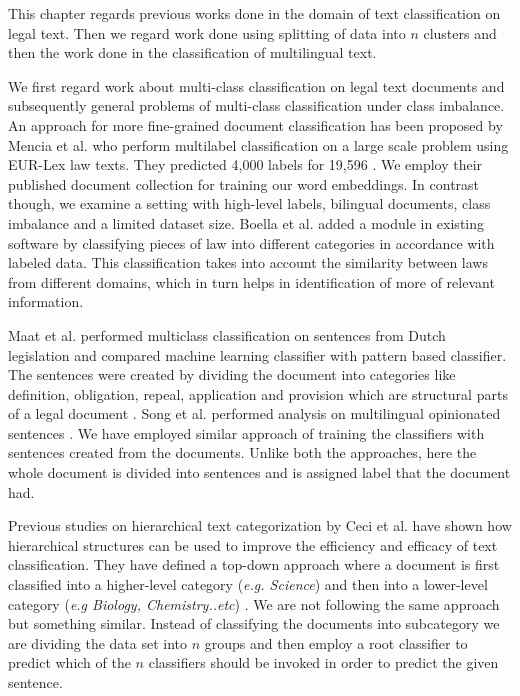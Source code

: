 \label{ch:relatedwork}

This chapter regards previous works done in the domain of text classification on legal text. Then we regard work done using  splitting of data into $n$ clusters and then the work done in the classification of multilingual text.

We first regard work about multi-class classification on legal text documents and subsequently general problems of multi-class classification under class imbalance. An approach for more fine-grained document classification has been proposed by Mencia et al. who perform multilabel classification on a large scale problem using EUR-Lex law texts. They predicted 4,000 labels for 19,596  \cite{mencia2010efficient}. We employ their published document collection for training our word embeddings. In contrast though, we examine a setting with high-level labels, bilingual documents, class imbalance and a limited dataset size. Boella et al. added a module in existing software by classifying pieces of law into different categories in accordance with labeled data. This classification takes into account the similarity between laws from different domains, which in turn helps in identification of more of relevant information. 


Maat et al. performed multiclass classification on sentences from Dutch legislation and compared machine learning classifier with pattern based classifier. The sentences were created by dividing the document into categories like definition,  obligation,  repeal, application and provision which are structural parts of a legal document \cite{de2010machine}. Song et al. performed analysis on multilingual opinionated sentences \cite{oro15675}. We have employed similar approach of training the classifiers with sentences created from the documents. Unlike both the approaches, here the whole document is divided into sentences and is assigned label that the document had. 

Previous studies on hierarchical text categorization by Ceci et al. have shown how hierarchical structures can be used to improve the efficiency and efficacy of text classification. They have defined a top-down approach where a document is first classified into a higher-level category (\textit{e.g. Science}) and then into a lower-level category (\textit{e.g Biology, Chemistry..etc}) \cite{Ceci2007}. We are not following the same approach but something similar. Instead of classifying the documents into subcategory we are dividing the data set into $n$ groups and then employ a root classifier to predict which of the $n$ classifiers should be invoked in order to predict the given sentence.    

